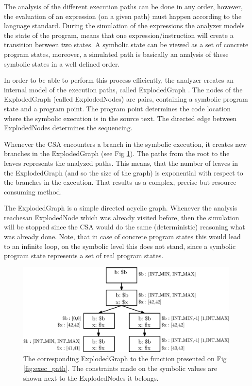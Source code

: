 The analysis of the different execution paths can be done in any order, 
however, the evaluation of an expression (on a given path) must happen 
according to the language standard.  
During the simulation of the expressions the analyzer models the state of the 
program, means that one expression/instruction will create a transition between 
two states. A symbolic state can be viewed as a set of concrete program states, 
moreover, a simulated path is basically an analysis of these symbolic states in 
a well defined order. 

In order to be able to perform this process efficiently, the analyzer creates 
an internal model of the execution paths, called ExplodedGraph 
\cite{explodedgraph}. The nodes of the ExplodedGraph (called ExplodedNodes) are 
pairs, containing a symbolic program state and a program point. The program 
point determines the code location where the symbolic execution is in the 
source text. The directed edge between ExplodedNodes determines the sequencing.

Whenever the CSA encounters a branch in the symbolic execution, it creates new 
branches in the ExplodedGraph (see Fig \ref{fig:exploded_graph}). The paths
from the root to the leaves represents the analyzed paths. This means, that the 
number of leaves in the ExplodedGraph (and so the size of the graph) is 
exponential with respect to the branches in the execution. That results us a 
complex, precise but resource consuming method.

The ExplodedGraph is a simple directed acyclic graph. Whenever the analysis 
reachesan ExplodedNode which was already visited before, then the simulation 
will be stopped since the CSA would do the same (deterministic) reasoning what 
was already done. Note, that in case of concrete program states this would lead 
to an infinite loop, on the symbolic level this does not stand, since a
symbolic program state represents a set of real program states.

\begin{figure}[h]
	\centering
	\includegraphics[width=1\textwidth]{img/explodedgraph.eps}
	\caption{The corresponding ExplodedGraph to the function presented on Fig 
		\ref{fig:exec_path}. The constraints made on the symbolic values are 
		shown next to the ExplodedNodes it belongs.}
	\label{fig:exploded_graph}
\end{figure}

